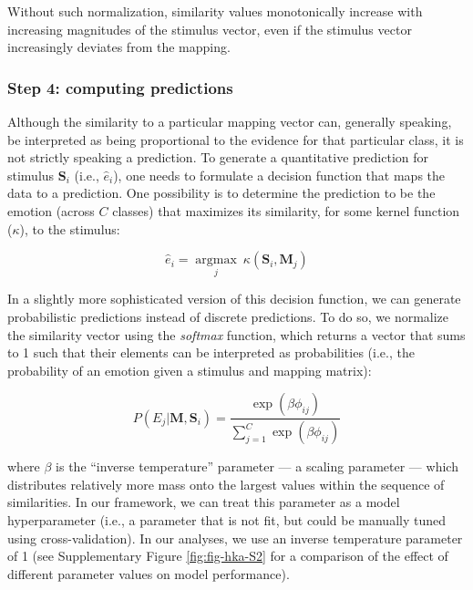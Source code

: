 \documentclass[11pt,american,a4paper,oneside,]{memoir} %
\begin{document}
Without such normalization, similarity values monotonically increase with increasing magnitudes of the stimulus vector, even if the stimulus vector increasingly deviates from the mapping.

\hypertarget{step-4-computing-predictions}{%
\subsubsection{Step 4: computing predictions}\label{step-4-computing-predictions}}

Although the similarity to a particular mapping vector can, generally speaking, be interpreted as being proportional to the evidence for that particular class, it is not strictly speaking a prediction. To generate a quantitative prediction for stimulus \(\mathbf{S}_{i}\) (i.e., \(\hat{e}_{i}\)), one needs to formulate a decision function that maps the data to a prediction. One possibility is to determine the prediction to be the emotion (across \(C\) classes) that maximizes its similarity, for some kernel function (\(\kappa\)), to the stimulus:

\begin{equation}
\hat{e}_{i} = \underset{j}{\operatorname{\mathrm{argmax}}}\ \kappa(\mathbf{S}_{i}, \mathbf{M}_{j})
\end{equation}

In a slightly more sophisticated version of this decision function, we can generate probabilistic predictions instead of discrete predictions. To do so, we normalize the similarity vector using the \emph{softmax} function, which returns a vector that sums to 1 such that their elements can be interpreted as probabilities (i.e., the probability of an emotion given a stimulus and mapping matrix):

\begin{equation}
P(E_{j} | \mathbf{M}, \mathbf{S}_{i}) = \frac{\exp(\beta\phi_{ij})}{\sum_{j=1}^{C}\exp(\beta\phi_{ij})}
\end{equation}

where \(\beta\) is the ``inverse temperature'' parameter --- a scaling parameter --- which distributes relatively more mass onto the largest values within the sequence of similarities. In our framework, we can treat this parameter as a model hyperparameter (i.e., a parameter that is not fit, but could be manually tuned using cross-validation). In our analyses, we use an inverse temperature parameter of 1 (see Supplementary Figure \ref{fig:fig-hka-S2} for a comparison of the effect of different parameter values on model performance).
\end{document}
